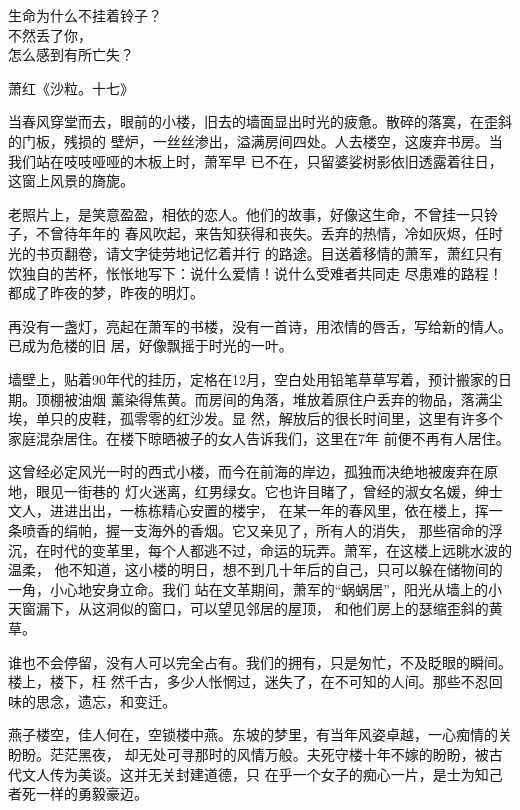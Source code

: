 	\endwriting



		\longpoem{}{}{}
			生命为什么不挂着铃子？\\
			不然丢了你，\\
			怎么感到有所亡失？

			\hspace{4em} 萧红《沙粒。十七》
		\endlongpoem


		当春风穿堂而去，眼前的小楼，旧去的墙面显出时光的疲惫。散碎的落寞，在歪斜的门板，残损的
	壁炉，一丝丝渗出，溢满房间四处。人去楼空，这废弃书房。当我们站在吱吱哑哑的木板上时，萧军早
	已不在，只留婆娑树影依旧透露着往日，这窗上风景的旖旎。


		老照片上，是笑意盈盈，相依的恋人。他们的故事，好像这生命，不曾挂一只铃子，不曾待年年的
	春风吹起，来告知获得和丧失。丢弃的热情，冷如灰烬，任时光的书页翻卷，请文字徒劳地记忆着并行
	的路途。目送着移情的萧军，萧红只有饮独自的苦杯，怅怅地写下：说什么爱情！说什么受难者共同走
	尽患难的路程！都成了昨夜的梦，昨夜的明灯。


		再没有一盏灯，亮起在萧军的书楼，没有一首诗，用浓情的唇舌，写给新的情人。已成为危楼的旧
	居，好像飘摇于时光的一叶。

		墙壁上，贴着90年代的挂历，定格在12月，空白处用铅笔草草写着，预计搬家的日期。顶棚被油烟
	薰染得焦黄。而房间的角落，堆放着原住户丢弃的物品，落满尘埃，单只的皮鞋，孤零零的红沙发。显
	然，解放后的很长时间里，这里有许多个家庭混杂居住。在楼下晾晒被子的女人告诉我们，这里在7年
	前便不再有人居住。

		这曾经必定风光一时的西式小楼，而今在前海的岸边，孤独而决绝地被废弃在原地，眼见一街巷的
	灯火迷离，红男绿女。它也许目睹了，曾经的淑女名媛，绅士文人，进进出出，一栋栋精心安置的楼宇，
	在某一年的春风里，依在楼上，挥一条喷香的绢帕，握一支海外的香烟。它又亲见了，所有人的消失，
	那些宿命的浮沉，在时代的变革里，每个人都逃不过，命运的玩弄。萧军，在这楼上远眺水波的温柔，
	他不知道，这小楼的明日，想不到几十年后的自己，只可以躲在储物间的一角，小心地安身立命。我们
	站在文革期间，萧军的“蜗蜗居”，阳光从墙上的小天窗漏下，从这洞似的窗口，可以望见邻居的屋顶，
	和他们房上的瑟缩歪斜的黄草。

		谁也不会停留，没有人可以完全占有。我们的拥有，只是匆忙，不及眨眼的瞬间。楼上，楼下，枉
	然千古，多少人怅惘过，迷失了，在不可知的人间。那些不忍回味的思念，遗忘，和变迁。

		燕子楼空，佳人何在，空锁楼中燕。东坡的梦里，有当年风姿卓越，一心痴情的关盼盼。茫茫黑夜，
	却无处可寻那时的风情万般。夫死守楼十年不嫁的盼盼，被古代文人传为美谈。这并无关封建道德，只
	在乎一个女子的痴心一片，是士为知己者死一样的勇毅豪迈。

